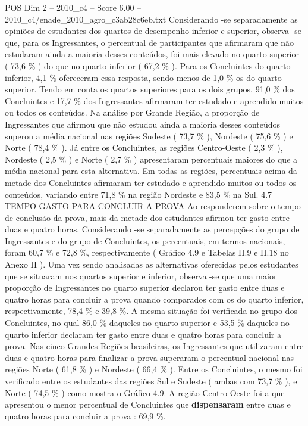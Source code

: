 \begin{textsample}{POS Dim 2 – 2010\_c4 – Score 6.00 – 2010\_c4/enade\_2010\_agro\_c3ab28c6eb.txt}
Considerando -se separadamente as opiniões de estudantes dos quartos de desempenho inferior e superior, observa -se que, para os Ingressantes, o percentual de participantes que afirmaram que não estudaram ainda a maioria desses conteúdos, foi mais elevado no quarto superior ( 73,6 \% ) do que no quarto inferior ( 67,2 \% ).
Para os Concluintes do quarto inferior, 4,1 \% ofereceram essa resposta, sendo menos de 1,0 \% os do quarto superior.
Tendo em conta os quartos superiores para os dois grupos, 91,0 \% dos Concluintes e 17,7 \% dos Ingressantes afirmaram ter estudado e aprendido muitos ou todos os conteúdos.
Na análise por Grande Região, a proporção de Ingressantes que afirmou que não estudou ainda a maioria desses conteúdos superou a média nacional nas regiões Sudeste ( 73,7 \% ), Nordeste ( 75,6 \% ) e Norte ( 78,4 \% ).
Já entre os Concluintes, as regiões Centro-Oeste ( 2,3 \% ), Nordeste ( 2,5 \% ) e Norte ( 2,7 \% ) apresentaram percentuais maiores do que a média nacional para esta alternativa.
Em todas as regiões, percentuais acima da metade dos Concluintes afirmaram ter estudado e aprendido muitos ou todos os conteúdos, variando entre 71,8 \% na região Nordeste e 83,5 \% na Sul. 4.7 TEMPO GASTO PARA CONCLUIR A PROVA Ao responderem sobre o tempo de conclusão da prova, mais da metade dos estudantes afirmou ter gasto entre duas e quatro horas.
Considerando -se separadamente as percepções do grupo de Ingressantes e do grupo de Concluintes, os percentuais, em termos nacionais, foram 60,7 \% e 72,8 \%, respectivamente ( Gráfico 4.9 e Tabelas II.9 e II.18 no Anexo II ).
Uma vez sendo analisadas as alternativas oferecidas pelos estudantes que se situaram nos quartos superior e inferior, observa -se que uma maior proporção de Ingressantes no quarto superior declarou ter gasto entre duas e quatro horas para concluir a prova quando comparados com os do quarto inferior, respectivamente, 78,4 \% e 39,8 \%.
A mesma situação foi verificada no grupo dos Concluintes, no qual 86,0 \% daqueles no quarto superior e 53,5 \% daqueles no quarto inferior declaram ter gasto entre duas e quatro horas para concluir a prova.
Nas cinco Grandes Regiões brasileiras, os Ingressantes que utilizaram entre duas e quatro horas para finalizar a prova superaram o percentual nacional nas regiões Norte ( 61,8 \% ) e Nordeste ( 66,4 \% ).
Entre os Concluintes, o mesmo foi verificado entre os estudantes das regiões Sul e Sudeste ( ambas com 73,7 \% ), e Norte ( 74,5 \% ) como mostra o Gráfico 4.9.
A região Centro-Oeste foi a que apresentou o menor percentual de Concluintes que \textbf{dispensaram} entre duas e quatro horas para concluir a prova : 69,9 \%.

\end{textsample}
